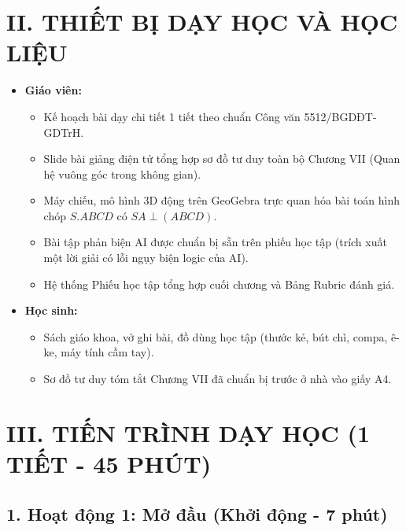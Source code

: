 \documentclass[12pt, a4paper]{article}
\begin{document}
\section*{II. THIẾT BỊ DẠY HỌC VÀ HỌC LIỆU}

\begin{itemize}[leftmargin=1.2cm]
    \item \textbf{Giáo viên:}
    \begin{itemize}[leftmargin=0.6cm]
        \item Kế hoạch bài dạy chi tiết 1 tiết theo chuẩn Công văn 5512/BGDĐT-GDTrH.
        \item Slide bài giảng điện tử tổng hợp sơ đồ tư duy toàn bộ Chương VII (Quan hệ vuông góc trong không gian).
        \item Máy chiếu, mô hình 3D động trên GeoGebra trực quan hóa bài toán hình chóp $S.ABCD$ có $SA \perp (ABCD)$.
        \item Bài tập phản biện AI được chuẩn bị sẵn trên phiếu học tập (trích xuất một lời giải có lỗi ngụy biện logic của AI).
        \item Hệ thống Phiếu học tập tổng hợp cuối chương và Bảng Rubric đánh giá.
    \end{itemize}

    \item \textbf{Học sinh:}
    \begin{itemize}[leftmargin=0.6cm]
        \item Sách giáo khoa, vở ghi bài, đồ dùng học tập (thước kẻ, bút chì, compa, ê-ke, máy tính cầm tay).
        \item Sơ đồ tư duy tóm tắt Chương VII đã chuẩn bị trước ở nhà vào giấy A4.
    \end{itemize}
\end{itemize}

\section*{III. TIẾN TRÌNH DẠY HỌC (1 TIẾT - 45 PHÚT)}

\subsection*{1. Hoạt động 1: Mở đầu (Khởi động - 7 phút)}
\end{document}

